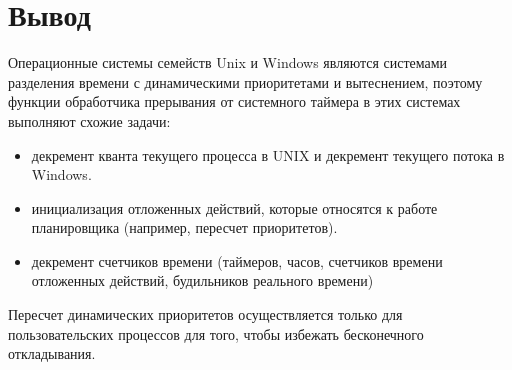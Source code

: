 \section*{Вывод}

Операционные системы семейств Unix и Windows являются системами разделения времени с динамическими приоритетами и вытеснением, поэтому функции обработчика прерывания от системного таймера в этих системах выполняют схожие задачи:

\begin{itemize}
	\item декремент кванта текущего процесса в UNIX и декремент текущего потока в Windows.
	\item инициализация отложенных действий, которые относятся к работе планировщика (например, пересчет приоритетов).
	\item декремент счетчиков времени (таймеров, часов, счетчиков времени отложенных действий, будильников реального времени) 
\end{itemize}

Пересчет динамических приоритетов осуществляется только для пользовательских процессов для того, чтобы избежать бесконечного откладывания.








